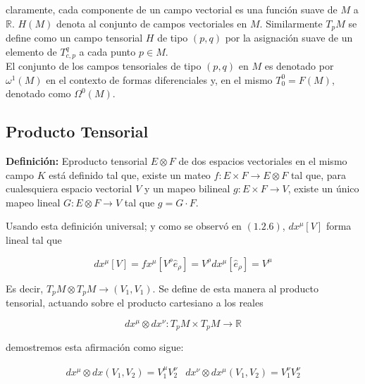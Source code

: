 \documentclass{report}
\begin{document}
{claramente, cada componente de un campo vectorial es una función suave de $M$ a $\mathbb{R}$. $H(M)$ denota al conjunto de campos vectoriales en $M$. Similarmente $T_{p}M$ se define como un campo tensorial $H$ de tipo $(p,q)$ por la asignación suave de un elemento de $T_{c,p} ^{q}$ a cada punto $p \in M$.\\

El conjunto de los campos tensoriales de tipo $(p,q)$ en $M$ es denotado por $\omega ^{1}(M)$ en el contexto de formas diferenciales y, en el mismo $T_{0}^{0} = F(M)$, denotado como $\Omega ^{0}(M)$.\\

\subsection{Producto Tensorial}


\textbf{Definición:} Eproducto tensorial $E \otimes F$ de dos espacios vectoriales en el mismo campo $K$ está definido tal que, existe un mateo $f : E \times F \rightarrow E \otimes F$ tal que, para cualesquiera espacio vectorial $V$ y un mapeo bilineal $g : E \times F \rightarrow V$, existe un único mapeo lineal $G : E \otimes F \rightarrow V $ tal que $g = G \cdot F$.

Usando esta definición universal; y como se observó en $(1.2.6)$, $dx^{\mu}[V]$ forma lineal tal que

\begin{equation}
dx^{\mu}[V] = fx^{\mu} [V^{\rho} \hat e_{\rho}] = V^{\rho} dx^{\mu}[\hat e_{\rho}] =V^{\mu}
\end{equation}

Es decir, $T_{p}M \otimes T_{p}M \rightarrow (V_{1}, V_{1})$. Se define de esta manera al producto tensorial, actuando sobre el producto cartesiano a los reales

\begin{equation}
dx^{\mu} \otimes dx^{\nu} : T_{p}M \times T_{p}M \rightarrow \mathbb{R}
\end{equation}

demostremos esta afirmación como sigue:

\begin{equation} 
\begin{split}
dx^{\mu} \otimes dx(V_1,V_2) = V_1 ^{\mu} V_2 ^{\nu}
&
dx^{\nu} \otimes dx^{\mu}(V_1,V_2) = V_1 ^{\nu} V_2 ^{\nu}
\end{split}
\end{equation}

}
\end{document}
